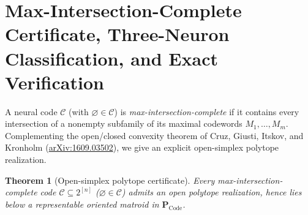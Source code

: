 \documentclass[11pt]{article}
\theoremstyle{plain}
\newtheorem{theorem}{Theorem}
\theoremstyle{definition}
\theoremstyle{remark}
\newcommand{\PCode}{\mathbf{P}_{\mathrm{Code}}}
\begin{document}
\section{Max-Intersection-Complete Certificate, Three-Neuron Classification, and Exact Verification}

A neural code $\mathcal{C}$ (with $\varnothing \in \mathcal{C}$) is \emph{max-intersection-complete} if it contains every intersection of a nonempty subfamily of its maximal codewords $M_1, \dots, M_m$. Complementing the open/closed convexity theorem of Cruz, Giusti, Itskov, and Kronholm (\href{https://arxiv.org/abs/1609.03502}{arXiv:1609.03502}), we give an explicit open-simplex polytope realization.

\begin{theorem}[Open-simplex polytope certificate]\label{thm:mic}
Every max-intersection-complete code $\mathcal{C} \subseteq 2^{[n]}$ ($\varnothing \in \mathcal{C}$) admits an open polytope realization, hence lies below a representable oriented matroid in $\PCode$.
\end{theorem}
\end{document}
